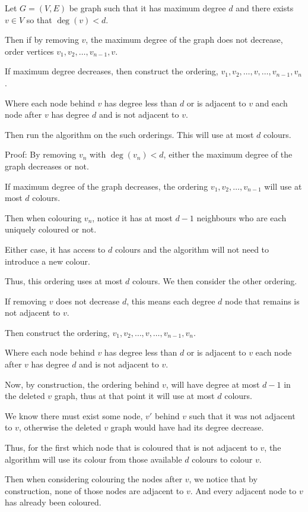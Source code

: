 \begin{soln}
	Let \(G = (V, E)\) be graph such that it has maximum degree \(d\) and there exists \(v \in V\) so that \(\deg(v) < d\).

	Then if by removing \(v\), the maximum degree of the graph does not decrease, order vertices \(v_1, v_2, \dots, v_{n-1}, v\).

	If maximum degree decreases, then construct the ordering, \(v_1, v_2, \dots, v, \dots, v_{n-1}, v_n\).

	Where each node behind \(v\) has degree less than \(d\) or is adjacent to \(v\) and each node after \(v\) has degree \(d\) and is not adjacent to \(v\).

	Then run the algorithm on the such orderings. This will use at most \(d\) colours.

	Proof: By removing \(v_n\) with \(\deg(v_n) < d\), either the maximum degree of the graph decreases or not.

	If maximum degree of the graph decreases, the ordering \(v_1, v_2, \dots, v_{n-1}\) will use at most \(d\) colours.

	Then when colouring \(v_n\), notice it has at most \(d - 1\) neighbours who are each uniquely coloured or not.

	Either case, it has access to \(d\) colours and the algorithm will not need to introduce a new colour.

	Thus, this ordering uses at most \(d\) colours. We then consider the other ordering.

	If removing \(v\) does not decrease \(d\), this means each degree \(d\) node that remains is not adjacent to \(v\).

	Then construct the ordering, \(v_1, v_2, \dots, v, \dots, v_{n-1}, v_n\).

	Where each node behind \(v\) has degree less than \(d\) or is adjacent to \(v\) each node after \(v\) has degree \(d\) and is not adjacent to \(v\).

	Now, by construction, the ordering behind \(v\), will have degree at most \(d - 1\) in the deleted \(v\) graph, thus at that point it will use at most \(d\) colours.

	We know there must exist some node, \(v'\) behind \(v\) such that it was not adjacent to \(v\), otherwise the deleted \(v\) graph would have had its degree decrease.

	Thus, for the first which node that is coloured that is not adjacent to \(v\), the algorithm will use its colour from those available \(d\) colours to colour \(v\).

	Then when considering colouring the nodes after \(v\), we notice that by construction, none of those nodes are adjacent to \(v\).
	And every adjacent node to \(v\) has already been coloured.


\end{soln}
